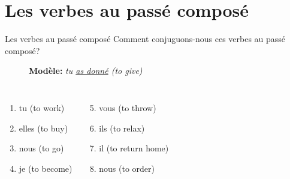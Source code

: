 \documentclass{beamer}
\begin{document}
  \section{Les verbes au passé composé}
    \begin{frame}{Les verbes au passé composé}
      Comment conjuguons-nous ces verbes au passé composé?
      \begin{description}
        \item[] \textbf{Modèle:} \emph{tu \underline{as donné} (to give)}
      \end{description}
      \begin{columns}[t]
          \begin{enumerate}
            \item tu \underline{} (to work)
            \item elles \underline{} (to buy)
            \item nous \underline{} (to go)
            \item je \underline{} (to become)
          \end{enumerate}
          \begin{enumerate}
            \setcounter{enumi}{4}
            \item vous \underline{} (to throw)
            \item ils \underline{} (to relax)
            \item il \underline{} (to return home)
            \item nous \underline{} (to order)
          \end{enumerate}
      \end{columns}
    \end{frame}
\end{document}
